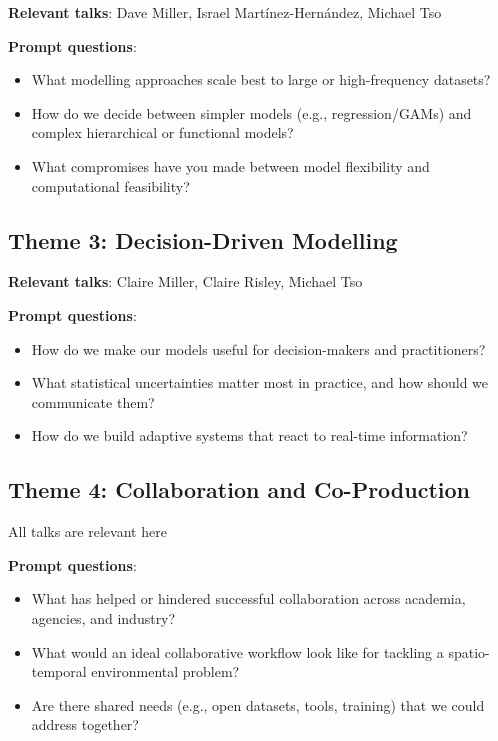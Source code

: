 \documentclass[
  11pt,
  letterpaper,
  DIV=11,
  numbers=noendperiod]{scrartcl}
\begin{document}
\textbf{Relevant talks}: Dave Miller, Israel Martínez-Hernández, Michael
Tso

\textbf{Prompt questions}:

\begin{itemize}
\item
  What modelling approaches scale best to large or high-frequency
  datasets?
\item
  How do we decide between simpler models (e.g., regression/GAMs) and
  complex hierarchical or functional models?
\item
  What compromises have you made between model flexibility and
  computational feasibility?
\end{itemize}

\subsection{Theme 3: Decision-Driven
Modelling}\label{theme-3-decision-driven-modelling}

\textbf{Relevant talks}: Claire Miller, Claire Risley, Michael Tso

\textbf{Prompt questions}:

\begin{itemize}
\item
  How do we make our models useful for decision-makers and
  practitioners?
\item
  What statistical uncertainties matter most in practice, and how should
  we communicate them?
\item
  How do we build adaptive systems that react to real-time information?
\end{itemize}

\subsection{Theme 4: Collaboration and
Co-Production}\label{theme-4-collaboration-and-co-production}

All talks are relevant here

\textbf{Prompt questions}:

\begin{itemize}
\item
  What has helped or hindered successful collaboration across academia,
  agencies, and industry?
\item
  What would an ideal collaborative workflow look like for tackling a
  spatio-temporal environmental problem?
\item
  Are there shared needs (e.g., open datasets, tools, training) that we
  could address together?
\end{itemize}
\end{document}
